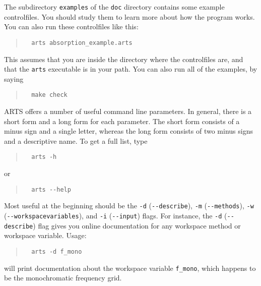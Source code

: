 \label{sec:concept:practical}

The subdirectory \verb|examples| of the \verb|doc| directory contains
some example controlfiles. You should study them to learn more about
how the program works. You can also run these controlfiles like this:
\begin{quote}
\begin{verbatim}
  arts absorption_example.arts
\end{verbatim}
\end{quote}
This assumes that you are inside the directory where the controlfiles
are, and that the \verb|arts| executable is in your path.  You can
also run all of the examples, by saying
\begin{quote}
\begin{verbatim}
  make check
\end{verbatim}
\end{quote}

ARTS offers a number of useful command line parameters. In general,
there is a short form and a long form for each parameter. The short
form consists of a minus sign and a single letter, whereas the long
form consists of two minus signs and a descriptive name. To get a full
list, type
\begin{quote}
\begin{verbatim}
  arts -h
\end{verbatim}
\end{quote}
or
\begin{quote}
\begin{verbatim}
  arts --help
\end{verbatim}
\end{quote}
Most useful at the beginning should be the \verb|-d|
(\verb|--describe|), \verb|-m| (\verb|--methods|), \verb|-w|
(\verb|--workspacevariables|), and \verb|-i| (\verb|--input|) flags.
For instance, the \verb|-d| (\verb|--describe|) flag gives you online
documentation for any workspace method or workspace variable. Usage:
\begin{quote}
\begin{verbatim}
  arts -d f_mono
\end{verbatim}
\end{quote}
will print documentation about the workspace variable \verb|f_mono|, which
happens to be the monochromatic frequency grid.

